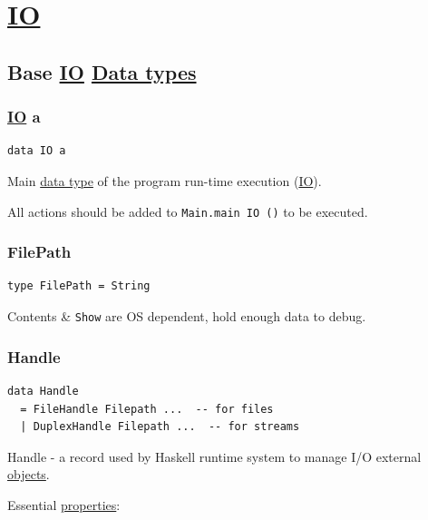\documentclass[a4paper,14pt,oneside]{book}
\begin{document}
\chapter{\hyperref[orgc074f4a]{IO}}
\label{sec:orgdef8c37}

\section{Base \hyperref[orgc074f4a]{IO} \hyperref[org376460b]{Data types}}
\label{sec:orge7c48e9}

\subsection{\hyperref[orgc074f4a]{IO} a}
\label{sec:orgca63a36}

\begin{verbatim}
data IO a
\end{verbatim}

Main \hyperref[org04fdb96]{data type} of the program run-time execution (\hyperref[orgc074f4a]{IO}).

All actions should be added to \texttt{Main.main IO ()} to be executed.

\subsection{FilePath}
\label{sec:org3414059}

\begin{verbatim}
type FilePath = String
\end{verbatim}

Contents \& \texttt{Show} are OS dependent, hold enough data to debug.

\subsection{Handle}
\label{sec:org7b0de2b}

\begin{verbatim}
data Handle
  = FileHandle Filepath ...  -- for files
  | DuplexHandle Filepath ...  -- for streams
\end{verbatim}

Handle - a record used by Haskell runtime system to manage I/O external \hyperref[orga601777]{objects}.

Essential \hyperref[orgf35086e]{properties}:
\end{document}
